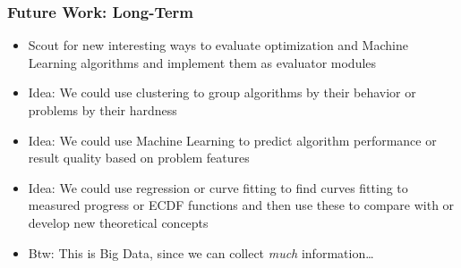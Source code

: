 \begin{frame}%
\frametitle{Future Work: Long-Term}%
\begin{itemize}%
\item Scout for new interesting ways to evaluate optimization and Machine Learning algorithms and implement them as evaluator modules%
\item<2-> Idea: We could use clustering to group algorithms by their behavior or problems by their hardness%
\item<3-> Idea: We could use Machine Learning to predict algorithm performance or result quality based on problem features%
\item<4-> Idea: We could use regression or curve fitting to find curves fitting to measured progress or ECDF functions and then use these to compare with or develop new theoretical concepts%
\item<5-> Btw: This is Big Data, since we can collect \emph{much} information\dots%
\end{itemize}%
\end{frame}%
%